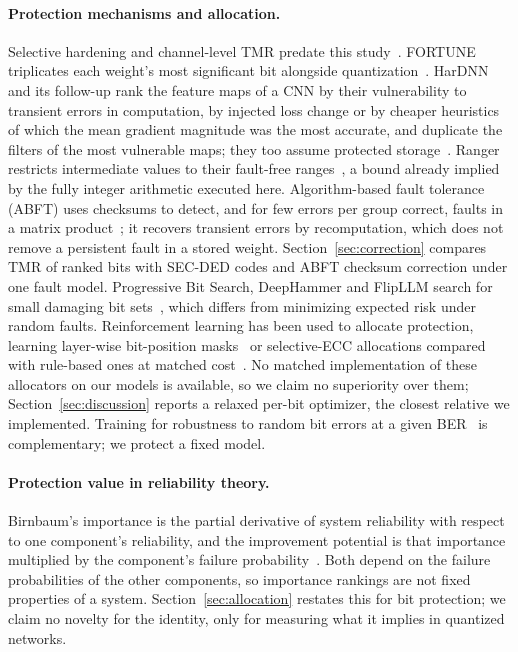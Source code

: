 \paragraph{Protection mechanisms and allocation.} Selective hardening and channel-level TMR predate this study~\cite{libano2019selective,garciabertoa2023selective}. FORTUNE triplicates each weight's most significant bit alongside quantization~\cite{nazari2024fortune}. HarDNN and its follow-up rank the feature maps of a CNN by their vulnerability to transient errors in computation, by injected loss change or by cheaper heuristics of which the mean gradient magnitude was the most accurate, and duplicate the filters of the most vulnerable maps; they too assume protected storage~\cite{mahmoud2020hardnn,mahmoud2021optimizing}. Ranger restricts intermediate values to their fault-free ranges~\cite{chen2021ranger}, a bound already implied by the fully integer arithmetic executed here. Algorithm-based fault tolerance (ABFT) uses checksums to detect, and for few errors per group correct, faults in a matrix product~\cite{alyamani2001abft,zhao2021ftcnn}; it recovers transient errors by recomputation, which does not remove a persistent fault in a stored weight. Section~\ref{sec:correction} compares TMR of ranked bits with SEC-DED codes and ABFT checksum correction under one fault model. Progressive Bit Search, DeepHammer and FlipLLM search for small damaging bit sets~\cite{rakin2019bitflip,yao2020deephammer,khalil2026flipllm}, which differs from minimizing expected risk under random faults. Reinforcement learning has been used to allocate protection, learning layer-wise bit-position masks~\cite{su2025rl} or selective-ECC allocations compared with rule-based ones at matched cost~\cite{alobaidi2026selectiveecc}. No matched implementation of these allocators on our models is available, so we claim no superiority over them; Section~\ref{sec:discussion} reports a relaxed per-bit optimizer, the closest relative we implemented. Training for robustness to random bit errors at a given BER~\cite{stutz2021biterror} is complementary; we protect a fixed model.

\paragraph{Protection value in reliability theory.} Birnbaum's importance is the partial derivative of system reliability with respect to one component's reliability, and the improvement potential is that importance multiplied by the component's failure probability~\cite{birnbaum1969importance,rausand2004system}. Both depend on the failure probabilities of the other components, so importance rankings are not fixed properties of a system. Section~\ref{sec:allocation} restates this for bit protection; we claim no novelty for the identity, only for measuring what it implies in quantized networks.
